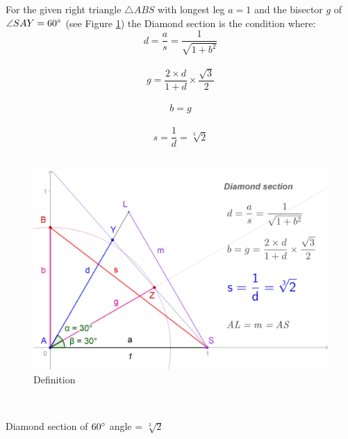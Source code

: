 \documentclass[12pt, letterpaper, oneside]{report}
\begin{document}
For the given right triangle $\triangle ABS$ with longest leg $a=1$ and  the bisector $g$ of $\angle SAY=60\degree$ (see Figure \ref{fig:definition}) the Diamond section is the condition where:
\begin{equation}
d=\frac{a}{s}=\frac{1}{\sqrt{1+b^{2}}}
\end{equation}
\\
\begin{equation}
 g=\frac{2\times d}{1+d}\times\frac{\sqrt{3}}{2}
\end{equation}
\\
\begin{equation}
b=g
\end{equation}
\\
\begin{equation}
s=\dfrac{1}{d}=\sqrt[3]{2}
\end{equation}
\\
\begin{figure}[h]
	\centering
	\includegraphics[width=0.7\linewidth]{images/ds_new_def.jpg}
	\caption{Definition}
	\label{fig:definition}
\end{figure} \\

\begin{center}
	\large{Diamond section of  $60 \degree$ angle = $\sqrt[3]{2}$ }
\\
\end{center}
\newpage
 
\end{document}

